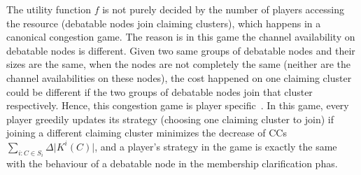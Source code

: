 \documentclass[10pt,journal,compsoc]{IEEEtran}
\theoremstyle{mytheoremstyle}
\theoremstyle{mytheoremstyle}
\theoremstyle{mytheoremstyle}
\begin{document}
\begin{itemize}
The utility function $f$ is not purely decided by the number of players accessing the resource (debatable nodes join claiming clusters), which happens in a canonical congestion game.
The reason is in this game the channel availability on debatable nodes is different.
Given two same groups of debatable nodes and their sizes are the same, when the nodes are not completely the same (neither are the channel availabilities on these nodes), the cost happened on one claiming cluster could be different if the two groups of debatable nodes join that cluster respectively.
Hence, this congestion game is player specific~\cite{Ackermann06purenash}.
In this game, every player greedily updates its strategy (choosing one claiming cluster to join) if joining a different claiming cluster minimizes the decrease of CCs $\sum_{i:C\in S_i} \Delta\vert K^i(C) \vert$, and a player's strategy in the game is exactly the same with the behaviour of a debatable node in the membership clarification phas.




\end{itemize}

\end{document}
